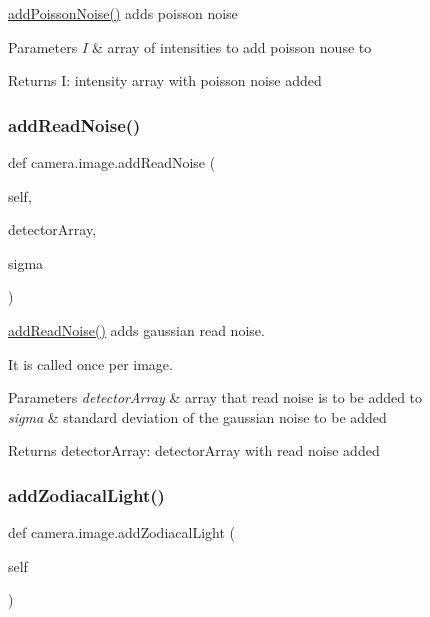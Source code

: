\hyperlink{classcamera_1_1image_aedd03c3f51edba0e50a4ae231498a503}{add\+Poisson\+Noise()} adds poisson noise 


\begin{DoxyParams}{Parameters}
{\em I} & array of intensities to add poisson nouse to \\
\hline
\end{DoxyParams}
\begin{DoxyReturn}{Returns}
I\+: intensity array with poisson noise added 
\end{DoxyReturn}
\mbox{\label{classcamera_1_1image_a050f22f120276a1833ac650dbe9d3584}} 
\subsubsection{\texorpdfstring{add\+Read\+Noise()}{addReadNoise()}}
{\footnotesize\ttfamily def camera.\+image.\+add\+Read\+Noise (\begin{DoxyParamCaption}\item[{}]{self,  }\item[{}]{detector\+Array,  }\item[{}]{sigma }\end{DoxyParamCaption})}



\hyperlink{classcamera_1_1image_a050f22f120276a1833ac650dbe9d3584}{add\+Read\+Noise()} adds gaussian read noise. 

It is called once per image. 
\begin{DoxyParams}{Parameters}
{\em detector\+Array} & array that read noise is to be added to \\
\hline
{\em sigma} & standard deviation of the gaussian noise to be added \\
\hline
\end{DoxyParams}
\begin{DoxyReturn}{Returns}
detector\+Array\+: detector\+Array with read noise added 
\end{DoxyReturn}
\mbox{\label{classcamera_1_1image_aa861ed59adf2eb74ef364fe1a5e3c6db}} 
\subsubsection{\texorpdfstring{add\+Zodiacal\+Light()}{addZodiacalLight()}}
{\footnotesize\ttfamily def camera.\+image.\+add\+Zodiacal\+Light (\begin{DoxyParamCaption}\item[{}]{self }\end{DoxyParamCaption})}



